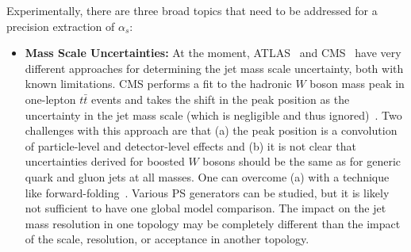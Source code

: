 \documentclass[11pt]{cernrep}
\begin{document}
Experimentally, there are three broad topics that need to be addressed for a precision extraction of $\alpha_s$:
%
\begin{itemize}
%
\item {\bf Mass Scale Uncertainties:} At the moment, ATLAS~\cite{Aaboud:2017qwh} and CMS~\cite{CMS-PAS-SMP-16-010} have very different approaches for determining the jet mass scale uncertainty, both with known limitations.
%
CMS performs a fit to the hadronic $W$ boson mass peak in one-lepton $t\bar{t}$ events and takes the shift in the peak position as the uncertainty in the jet mass scale (which is negligible and thus ignored)~\cite{Sirunyan:2016cao}.
%
Two challenges with this approach are that (a) the peak position is a convolution of particle-level and detector-level effects and (b) it is not clear that uncertainties derived for boosted $W$ bosons should be the same as for generic quark and gluon jets at all masses.
%
One can overcome (a) with a technique like forward-folding~\cite{ATLAS-CONF-2016-008,ATLAS-CONF-2016-035}.
%
Various PS generators can be studied, but it is likely not sufficient to have one global model comparison.
%
The impact on the jet mass resolution in one topology may be completely different than the impact of the scale, resolution, or acceptance in another topology.


\end{itemize}
\end{document}
